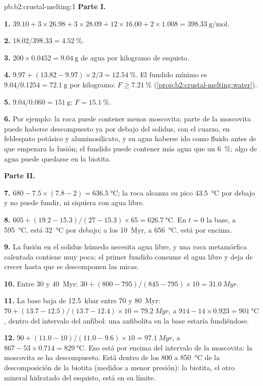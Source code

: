 \begin{solution}{pb:b2:crustal-melting:1}
\noindent\textbf{Parte I.}

\textbf{1.} $39.10 + 3\times26.98 + 3\times28.09 + 12\times16.00 + 2\times1.008 =
\qty{398.33}{\gram\per\mole}$.

\textbf{2.} $18.02/398.33 = \qty{4.52}{\percent}$.

\textbf{3.} $200\times0.0452 = \qty{9.04}{\gram}$ de agua por kilogramo de esquisto.

\textbf{4.} $9.97 + (13.82 - 9.97)\times2/3 = \qty{12.54}{\percent}$. El fundido mínimo es
$9.04/0.1254 = \qty{72.1}{\gram}$ por kilogramo: $F \ge \qty{7.21}{\percent}$
(\cref{prop:b2:crustal-melting:water}).

\textbf{5.} $9.04/0.060 = \qty{151}{\gram}$: $F = \qty{15.1}{\percent}$.

\textbf{6.} Por ejemplo: la roca puede contener menos moscovita; parte de la moscovita puede
haberse descompuesto ya por debajo del solidus, con el cuarzo, en feldespato potásico y
aluminosilicato, y su agua haberse ido como fluido antes de que empezara la fusión; el fundido puede contener más
agua que un \qty{6}{\percent}; algo de agua puede quedarse en la biotita.

\noindent\textbf{Parte II.}

\textbf{7.} $680 - 7.5\times(7.8 - 2) = \qty{636.5}{\celsius}$; la roca alcanza su pico
\qty{43.5}{\celsius} por debajo y no puede fundir, ni siquiera con agua libre.

\textbf{8.} $605 + (19.2 - 15.3)/(27 - 15.3)\times65 = \qty{626.7}{\celsius}$. En
$t = 0$ la base, a \qty{595}{\celsius}, está \qty{32}{\celsius} por debajo; a los
\qty{10}{Myr}, a \qty{656}{\celsius}, está por encima.

\textbf{9.} La fusión en el solidus húmedo necesita agua libre, y una roca metamórfica calentada
contiene muy poca: el primer fundido consume el agua libre y deja de crecer
hasta que se descomponen las micas.

\textbf{10.} Entre 30 y \qty{40}{Myr}: $30 + (800 - 795)/(845 - 795)\times10 =
\qty{31.0}{Myr}$.

\textbf{11.} La base baja de \qty{12.5}{kbar} entre 70 y \qty{80}{Myr}:
$70 + (13.7 - 12.5)/(13.7 - 12.4)\times10 = \qty{79.2}{Myr}$, a
$914 - 14\times0.923 = \qty{901}{\celsius}$, dentro del intervalo del anfíbol: una anfibolita
en la base estaría fundiéndose.

\textbf{12.} $90 + (11.0 - 10)/(11.0 - 9.6)\times10 = \qty{97.1}{Myr}$, a $867 -
53\times0.714 = \qty{829}{\celsius}$. Eso está por encima del intervalo de la moscovita: la moscovita
se ha descompuesto. Está dentro de los 800 a \qty{850}{\celsius} de la descomposición de la biotita
(medidos a menor presión): la biotita, el otro mineral hidratado del esquisto, está en su
límite.


\end{solution}
